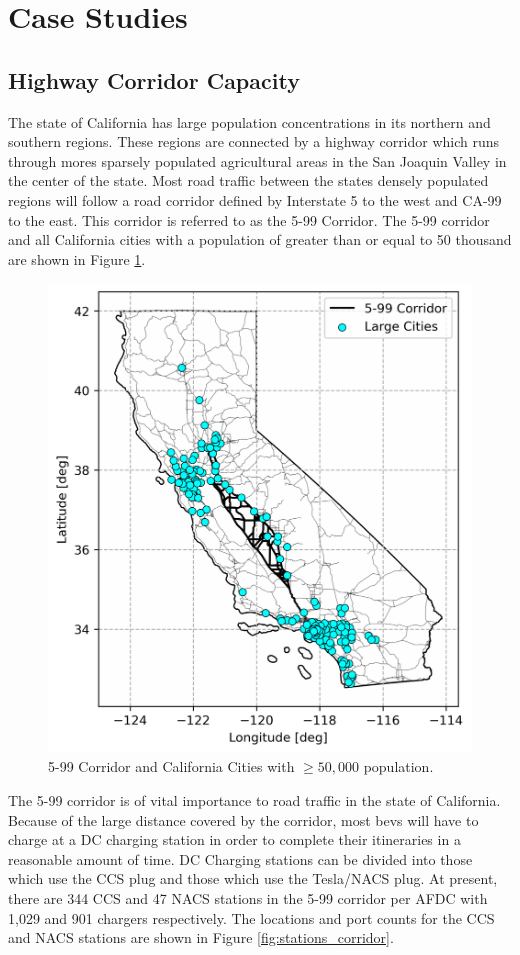 \section{Case Studies}

\subsection{Highway Corridor Capacity}

The state of California has large population concentrations in its northern and southern regions. These regions are connected by a highway corridor which runs through mores sparsely populated agricultural areas in the San Joaquin Valley in the center of the state. Most road traffic between the states densely populated regions will follow a road corridor defined by Interstate 5 to the west and CA-99 to the east. This corridor is referred to as the 5-99 Corridor. The 5-99 corridor and all California cities with a population of greater than or equal to 50 thousand are shown in Figure \ref{fig:places_corridor}.

\begin{figure}[H]
	\centering
	\includegraphics[width = .67\linewidth]{./figures/places_corridor.png}
	\caption{5-99 Corridor and California Cities with $\geq 50,000$ population.}
	\label{fig:places_corridor}
\end{figure}

The 5-99 corridor is of vital importance to road traffic in the state of California. Because of the large distance covered by the corridor, most \glspl{bev} will have to charge at a DC charging station in order to complete their itineraries in a reasonable amount of time. DC Charging stations can be divided into those which use the CCS plug and those which use the Tesla/NACS plug. At present, there are 344 CCS and 47 NACS stations in the 5-99 corridor per AFDC \citep{afdc_2023} with 1,029 and 901 chargers respectively. The locations and port counts for the CCS and NACS stations are shown in Figure \ref{fig:stations_corridor}.

